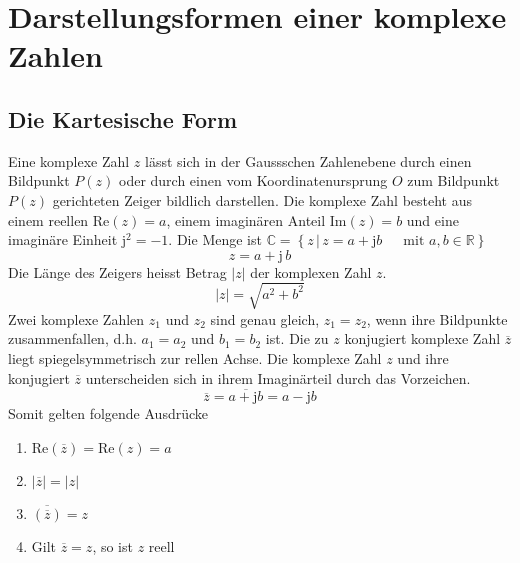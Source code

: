 \section{Darstellungsformen einer komplexe Zahlen}
\subsection{Die Kartesische Form}
Eine komplexe Zahl $z$ lässt sich in der Gaussschen Zahlenebene durch einen Bildpunkt $P\left(z\right)$ oder durch einen vom Koordinatenursprung $O$ zum Bildpunkt $P\left(z\right)$ gerichteten Zeiger bildlich darstellen. Die komplexe Zahl besteht aus einem reellen $\text{Re}\left(z\right)=a$, einem imaginären Anteil $\text{Im}\left(z\right)=b$ und eine imaginäre Einheit $\text{j}^2=-1$. Die Menge ist $\mathbb{C}=\left\{z\,\vert\, z=a+\text{j}b\quad\,\text{ mit }a,b\in \mathbb{R}\right\}$
\begin{equation}
\boxed{z=a+\text{j}\,b}
\end{equation}
Die Länge des Zeigers heisst Betrag $\Big\vert z\Big\vert$ der komplexen Zahl $z$.
\begin{equation}
\boxed{\Big\vert z\Big\vert=\sqrt{a^2+b^2}}
\end{equation}
Zwei komplexe Zahlen $z_1$ und $z_2$ sind genau gleich, $z_1=z_2$, wenn ihre Bildpunkte zusammenfallen, d.h. $a_1=a_2$ und $b_1=b_2$ ist.
\newline\newline
Die zu $z$ konjugiert komplexe Zahl $\overline{z}$ liegt spiegelsymmetrisch zur rellen Achse. Die komplexe Zahl $z$ und ihre konjugiert $\overline{z}$ unterscheiden sich in ihrem Imaginärteil durch das Vorzeichen.
\begin{equation}
\boxed{\overline{z}=\overline{a+\text{j}b}=a-\text{j}b}
\end{equation}
Somit gelten folgende Ausdrücke
\begin{enumerate}[$(i)$]
\item $\text{Re}\left(\overline{z}\right)=\text{Re}\left(z\right)=a$
\item $\Big\vert \overline{z}\Big\vert=\Big\vert z\Big\vert$
\item $\overline{\left(\overline{z}\right)}=z$
\item Gilt $\overline{z}=z$, so ist $z$ reell
\end{enumerate}
